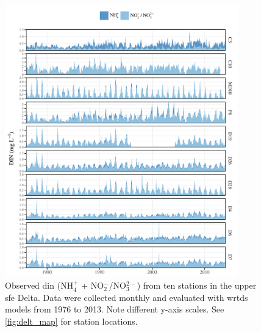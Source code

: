 \documentclass[journal = esthag, manuscript = article]{achemso}\usepackage[]{graphicx}\usepackage[]{color}
\begin{document}
\begin{figure}[!ht]

{\centering \includegraphics[width=0.9\textwidth]{figs/obsdat-1} 

}

\caption{Observed \ac{din} (NH$_4^{+}$ + NO$_2^{-}$/NO$_3^{2-}$) from ten stations in the upper \ac{sfe} Delta.  Data were collected monthly and evaluated with \ac{wrtds} models from 1976 to 2013. Note different y-axis scales.  See \cref{fig:delt_map} for station locations.}\label{fig:obsdat}
\end{figure}
\end{document}
